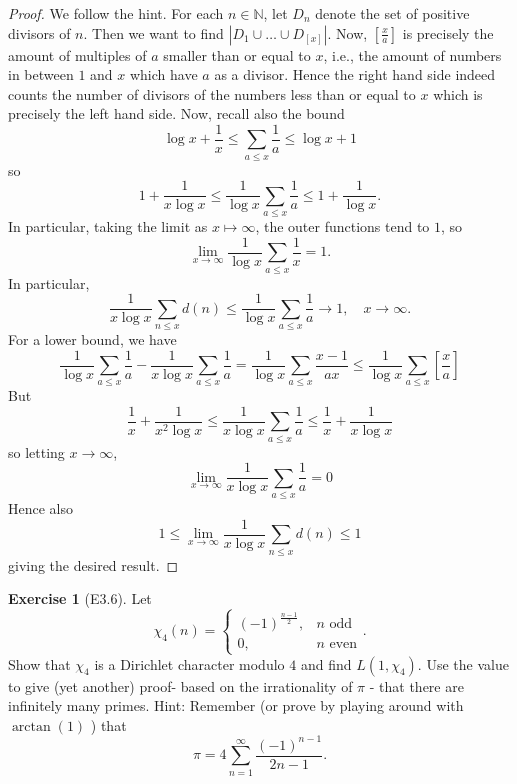 \documentclass[reqno]{amsart}
\theoremstyle{definition}
\newtheorem{exercise}[theorem]{Exercise}
\theoremstyle{remark}
\begin{document}
\begin{proof}
    We follow the hint.
    For each $n \in \mathbb{N} $, let
    $D_n$ denote the set of positive divisors of
    $n$. Then we want to find
    $\left| D_1 \cup \ldots \cup D_{\left[ x \right] } \right|  $.
    Now, $\left[ \frac{x}{a} \right] $ is precisely
    the amount of multiples of $a$ smaller than or equal to
    $x$, i.e., the amount of numbers in between $1$ and
    $x$ which have $a$ as a divisor.
    Hence the right hand side indeed counts the
    number of divisors of the numbers less than or equal to
     $x$ which is precisely the left hand side.
     Now, recall also the bound
     \[
     \log x + \frac{1}{x} \le \sum_{a \le x}\frac{1}{a}
     \le \log x + 1
     \] 
     so \[
     1 + \frac{1}{x \log x} \le \frac{1}{\log x}
     \sum_{a \le x} \frac{1}{a} \le 1 + \frac{1}{\log x}.
     \] 
     In particular, taking the limit as
     $x \mapsto \infty$, the outer
     functions tend to $1$, so
     \[
     \lim_{x \to \infty} \frac{1}{\log x} \sum_{a \le x}\frac{1}{x}
     = 1.
     \] 
     In particular,
     \[
     \frac{1}{x \log x}\sum_{n\le x} d(n)
     \le \frac{1}{\log x} \sum_{a \le x} \frac{1}{a}
     \to 1, \quad x \to \infty.
     \] 
     For a lower bound, we have
     \[
     \frac{1}{\log x}  
     \sum_{a\le x} \frac{1}{a} -
     \frac{1}{x\log x} \sum_{a\le x}\frac{1}{a}
     = \frac{1}{\log x} \sum_{a \le x} \frac{x-1}{ax}
     \le \frac{1}{\log x} \sum_{a\le x} \left[ \frac{x}{a} \right] 
     \] 
     But
     \[
     \frac{1}{x} + \frac{1}{x^2 \log x}
     \le \frac{1}{x \log x} \sum_{a\le x} \frac{1}{a}
     \le \frac{1}{x} + \frac{1}{x \log x}
     \] 
     so letting $x \to \infty$, 
     \[
     \lim_{x \to \infty} \frac{1}{x \log x} \sum_{a \le x}
     \frac{1}{a} = 0
     \] 
     Hence also
     \[
     1 \le \lim_{x \to \infty} \frac{1}{x \log x}
     \sum_{n \le x} d(n) \le 1
     \] 
     giving the desired result.
\end{proof}

\begin{exercise}[E3.6]
    Let  \[
    \chi_4 (n) = 
    \begin{cases}
        (-1)^{\frac{n-1}{2}},& n \text{ odd}\\
        0,& n \text{ even}
    \end{cases}.
    \] 
    Show that $\chi_4$ is a Dirichlet character
    modulo $4$ and find
    $L\left( 1, \chi_4 \right) $. Use the value
    to give (yet another) proof- based on the
    irrationality of $\pi$ - that there
    are infinitely many primes.
    Hint: Remember (or prove by playing around with
    $\arctan (1)$ ) that
    \[
    \pi = 4 \sum_{n=1}^{\infty} \frac{(-1)^{n-1}}{2n-1}.
    \] 
\end{exercise}
\end{document}
